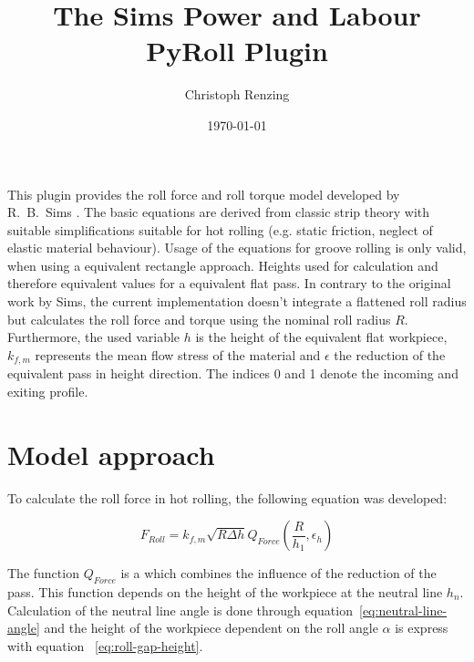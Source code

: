 \documentclass[11pt]{PyRollDocs}
\begin{document}
    \title{The Sims Power and Labour PyRoll Plugin}
    \author{Christoph Renzing}
    \date{\today}

    \maketitle

    This plugin provides the roll force and roll torque model developed by R.~B.~Sims \textcite{Sims1954}.
    The basic equations are derived from classic strip theory with suitable simplifications suitable for hot rolling (e.g. static friction, neglect of elastic material behaviour).
    Usage of the equations for groove rolling is only valid, when using a equivalent rectangle approach.
    Heights used for calculation and therefore equivalent values for a equivalent flat pass.
    In contrary to the original work by Sims, the current implementation doesn't integrate a flattened roll radius but calculates the roll force and torque using the nominal roll radius $R$.
    Furthermore, the used variable $h$ is the height of the equivalent flat workpiece, $k_{f,m}$ represents the mean flow stress of the material and $\epsilon$ the reduction of the equivalent pass in height direction.
    The indices 0 and 1 denote the incoming and exiting profile.


    \section{Model approach}\label{sec:model-approach}

    To calculate the roll force in hot rolling, the following equation was developed:

    \begin{equation}
        F_{Roll} = k_{f, m} \sqrt{R \Delta h} Q_{Force}(\frac{R}{h_1}, \epsilon_h)
        \label{eq:sims-force-simple}
    \end{equation}

    The function $Q_{Force}$ is a which combines the influence of the reduction of the pass.
    This function depends on the height of the workpiece at the neutral line $h_{n}$.
    Calculation of the neutral line angle is done through equation~\ref{eq:neutral-line-angle} and the height of the workpiece dependent on the roll angle $\alpha$ is express with equation ~\ref{eq:roll-gap-height}.
\end{document}
